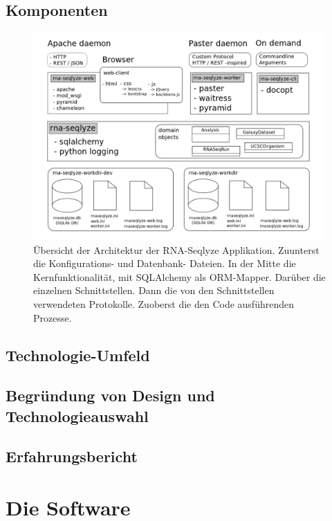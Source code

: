 \documentclass[a4paper]{thesis}
\begin{document}
\subsection{Komponenten}

\begin{figure}[h!]
\includegraphics{img/overview_architektur}
\caption{
	Übersicht der Architektur der RNA-Seqlyze Applikation.
	Zuunterst die Konfigurations- und Datenbank- Dateien.
	In der Mitte die Kernfunktionalität, mit SQLAlchemy
	als ORM-Mapper. Darüber die einzelnen Schnittstellen.
	Dann die von den Schnittstellen verwendeten Protokolle.
	Zuoberst die den Code ausführenden Prozesse.
}
\label{fig:arch}
\end{figure}

\subsection{Technologie-Umfeld}

\subsection{Begründung von Design und Technologieauswahl}

\subsection{Erfahrungsbericht}

\section{Die Software}
\end{document}
